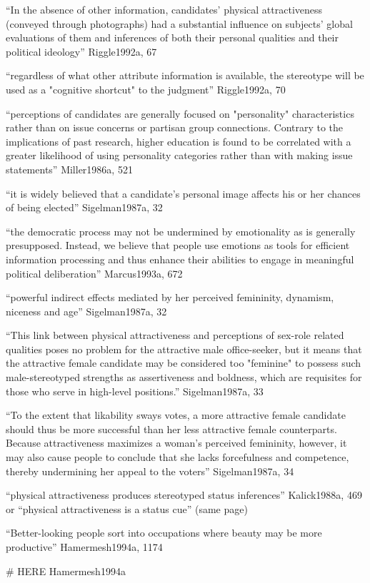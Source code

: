 ``In the absence of other information, candidates' physical attractiveness (conveyed through photographs) had a substantial influence on subjects' global evaluations of them and inferences of both their personal qualities and their political ideology'' Riggle1992a, 67

``regardless of what other attribute information is available, the stereotype will be used as a "cognitive shortcut" to the judgment'' Riggle1992a, 70


``perceptions of candidates are generally focused on "personality" characteristics rather than on issue concerns or partisan group connections. Contrary to the implications of past research, higher education is found to be correlated with a greater likelihood of using personality categories rather than with making issue statements'' Miller1986a, 521

``it is widely believed that a candidate's personal image affects his or her chances of being elected'' Sigelman1987a, 32

``the democratic process may not be undermined by emotionality as is generally presupposed. Instead, we believe that people use emotions as tools for efficient information processing and thus enhance their abilities to engage in meaningful political deliberation'' Marcus1993a, 672



``powerful indirect effects mediated by her perceived femininity, dynamism, niceness and age'' Sigelman1987a, 32

``This link between physical attractiveness and perceptions of sex-role related qualities poses no problem for the attractive male office-seeker, but it means that the attractive female candidate may be considered too "feminine" to possess such male-stereotyped strengths as assertiveness and boldness, which are requisites for those who serve in high-level positions.''  Sigelman1987a, 33

``To the extent that likability sways votes, a more attractive female candidate should thus be more successful than her less attractive female counterparts. Because attractiveness maximizes a woman's perceived femininity, however, it may also cause people to conclude that she lacks forcefulness and competence, thereby undermining her appeal to the voters''  Sigelman1987a, 34


``physical attractiveness produces stereotyped status inferences'' Kalick1988a, 469 or ``physical attractiveness is a status cue'' (same page)

``Better-looking people sort into occupations where beauty may be more productive'' Hamermesh1994a, 1174


# HERE Hamermesh1994a

